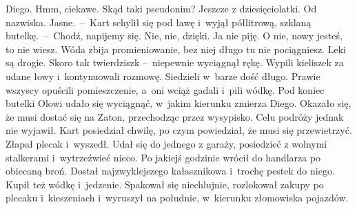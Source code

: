 \documentclass[../MAIN.tex]{subfiles}
\begin{document}
\xx Diego.
\xx Hmm, ciekawe. Skąd taki pseudonim?
\xx Jeszcze z dziesięciolatki. Od nazwiska.
\xx Jasne.~--~Kart schylił się pod ławę i~wyjął półlitrową, szklaną butelkę.~--~Chodź, napijemy się.
\xx Nie, nie, dzięki. Ja nie piję.
\xx O nie, nowy jesteś, to nie wiesz. Wóda zbija promieniowanie, bez niej długo tu nie pociągniesz. Leki są drogie.
\xx Skoro tak twierdzisz\3k --~niepewnie wyciągnął rękę.
\qd
\hspace{24.1em}Wypili kieliszek za udane łowy i~kontynuowali rozmowę. Siedzieli w~barze dość długo. Prawie wszyscy opuścili pomieszczenie, a~oni wciąż gadali i~pili wódkę. Pod koniec butelki Olowi udało się wyciągnąć, w~jakim kierunku zmierza Diego. Okazało się, że musi dostać się na Zaton, przechodząc przez wysypisko. Celu podróży jednak nie wyjawił.
\pp
Kart posiedział chwilę, po czym powiedział, że musi się przewietrzyć. Złapał plecak i~wyszedł. Udał się do jednego z garaży, posiedzieć z wolnymi stalkerami i~wytrzeźwieć nieco. Po jakiejś godzinie wrócił do handlarza po obiecaną broń. Dostał najzwyklejszego kałasznikowa i~trochę pestek do niego. Kupił też wódkę i~jedzenie.
Spakował się niechlujnie, rozlokował zakupy po plecaku i~kieszeniach i~wyruszył na południe, w~kierunku złomowiska pojazdów.
\end{document}
